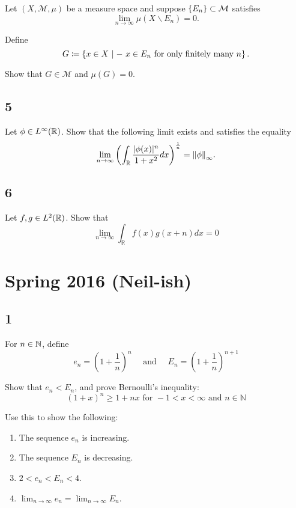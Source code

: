 Let \((X, \mathcal M, \mu)\) be a measure space and suppose
\(\left\{{E_n}\right\} \subset \mathcal M\) satisfies \[
\lim _{n \rightarrow \infty} \mu\left(X \backslash E_{n}\right)=0.
\]

Define \[
G \coloneqq \left\{{x\in X {~\mid- ~} x\in E_n \text{ for only finitely many  } n}\right\}.
\]

Show that \(G \in \mathcal M\) and \(\mu(G) = 0\).

\hypertarget{section-4}{%
\subsection{5}\label{section-4}}

Let \(\phi\in L^\infty({\mathbb{R}})\). Show that the following limit exists and
satisfies the equality \[
\lim _{n \rightarrow \infty}\left(\int_{\mathbb{R}} \frac{|\phi(x)|^{n}}{1+x^{2}} d x\right)^{\frac{1}{n}} = {\left\lVert {\phi} \right\rVert}_\infty.
\]

\hypertarget{section-5}{%
\subsection{6}\label{section-5}}

Let \(f, g \in L^2({\mathbb{R}})\). Show that \[
\lim _{n \rightarrow \infty} \int_{\mathbb{R}} f(x) g(x+n) d x=0
\]

\hypertarget{spring-2016-neil-ish}{%
\section{Spring 2016 (Neil-ish)}\label{spring-2016-neil-ish}}

\hypertarget{section}{%
\subsection{1}\label{section}}

For \(n\in {\mathbb{N}}\), define \[
e_{n}=\left(1+\frac{1}{n}\right)^{n} 
\quad \text { and } \quad 
E_{n}=\left(1+\frac{1}{n}\right)^{n+1}
\]

Show that \(e_n < E_n\), and prove Bernoulli's inequality: \[
(1+x)^{n} \geq 1+n x \text { for }-1<x<\infty \text { and } n \in \mathbb{N}
\]

Use this to show the following:

\begin{enumerate}
\def\labelenumi{\arabic{enumi}.}
\tightlist
\item
  The sequence \(e_n\) is increasing.
\item
  The sequence \(E_n\) is decreasing.
\item
  \(2 < e_n < E_n < 4\).
\item
  \(\lim _{n \rightarrow \infty} e_{n}=\lim _{n \rightarrow \infty} E_{n}\).
\end{enumerate}

